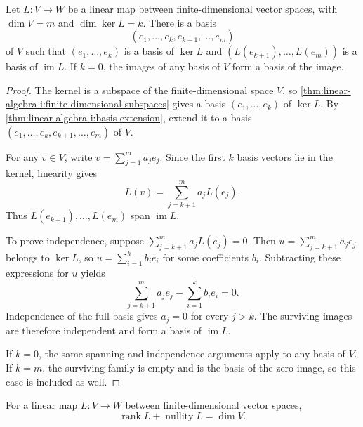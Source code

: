 \begin{lemma}
  \label{thm:linear-algebra-i:adapted-basis}
  Let \(L:V\to W\) be a linear map between finite-dimensional vector
  spaces, with \(\dim V=m\) and \(\dim\ker L=k\). There is a basis
  \[
    (e_1,\ldots,e_k,e_{k+1},\ldots,e_m)
  \]
  of \(V\) such that \((e_1,\ldots,e_k)\) is a basis of \(\ker L\) and
  \((L(e_{k+1}),\ldots,L(e_m))\) is a basis of \(\operatorname{im}L\).
  If \(k=0\), the images of any basis of \(V\) form a basis of the image.
\end{lemma}
\begin{pendingreview}
\begin{proof}
  The kernel is a subspace of the finite-dimensional space \(V\), so
  \autoref{thm:linear-algebra-i:finite-dimensional-subspaces} gives a basis
  \((e_1,\ldots,e_k)\) of \(\ker L\). By
  \autoref{thm:linear-algebra-i:basis-extension}, extend it to a basis
  \((e_1,\ldots,e_k,e_{k+1},\ldots,e_m)\) of \(V\).

  For any \(v\in V\), write \(v=\sum_{j=1}^m a_j e_j\). Since the
  first \(k\) basis vectors lie in the kernel, linearity gives
  \[
    L(v)=\sum_{j=k+1}^m a_jL(e_j).
  \]
  Thus \(L(e_{k+1}),\ldots,L(e_m)\) span \(\operatorname{im}L\).

  To prove independence, suppose
  \(\sum_{j=k+1}^m a_jL(e_j)=0\). Then
  \(u=\sum_{j=k+1}^m a_j e_j\) belongs to \(\ker L\), so
  \(u=\sum_{i=1}^k b_i e_i\) for some coefficients \(b_i\). Subtracting
  these expressions for \(u\) yields
  \[
    \sum_{j=k+1}^m a_j e_j-\sum_{i=1}^k b_i e_i=0.
  \]
  Independence of the full basis gives \(a_j=0\) for every \(j>k\).
  The surviving images are therefore independent and form a basis of
  \(\operatorname{im}L\).

  If \(k=0\), the same spanning and independence arguments apply to any
  basis of \(V\). If \(k=m\), the surviving family is empty and is the
  basis of the zero image, so this case is included as well.
\end{proof}
\end{pendingreview}

\begin{theorem}
  \label{thm:linear-algebra-i:rank-nullity}
  For a linear map \(L:V\to W\) between finite-dimensional vector spaces,
  \[
    \operatorname{rank}L+\operatorname{nullity}L=\dim V.
  \]
\end{theorem}

